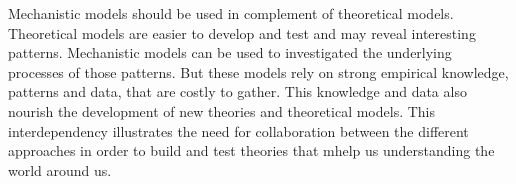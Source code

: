 Mechanistic models should be used in complement of theoretical models. Theoretical models are easier to develop and test and may reveal interesting patterns. Mechanistic models can be used to investigated the underlying processes of those patterns. But these models rely on strong empirical knowledge, patterns and data, that are costly to gather. This knowledge and data also nourish the development of new theories and theoretical models. This interdependency illustrates the need for collaboration between the different approaches in order to build and test theories that mhelp us understanding the world around us.

%
%
%
%
%
%
%
